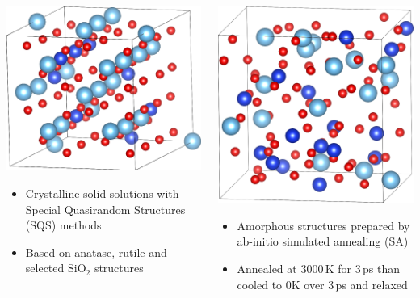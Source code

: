 \documentclass[noamsthm,8pt,t,xcolor={dvipsnames}]{beamer}
\begin{document}
\begin{frame}
   \begin{columns}
      \begin{column}{0.5\textwidth}
         \begin{center}
             \includegraphics[width=0.6\linewidth]{figures/SQS.png}
         \end{center}
         \begin{itemize}
            \item Crystalline solid solutions with Special Quasirandom Structures (SQS) methods
            \item Based on anatase, rutile and selected SiO$_2$ structures
         \end{itemize}
      \end{column}

      \pause

      \begin{column}{0.5\textwidth}
         \begin{center}
            \includegraphics[width=0.5\linewidth]{figures/am-SA.png}
         \end{center}
         \begin{itemize}
            \item Amorphous structures prepared by ab-initio simulated annealing (SA)
            \item Annealed at 3000\,K for 3\,ps than cooled to 0K over 3\,ps and relaxed
         \end{itemize}
      \end{column}
   \end{columns}
\end{frame}
\end{document}
